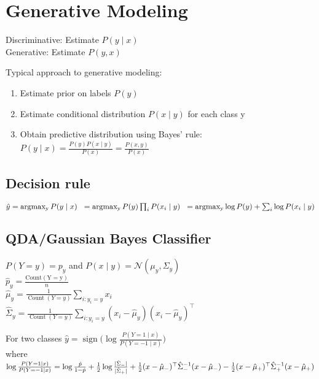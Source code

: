 \section*{Generative Modeling}
Discriminative: Estimate $P(y\mid x)$\\
Generative: Estimate $P(y,x)$

Typical approach to generative modeling:
\begin{enumerate}[noitemsep,leftmargin=6mm,topsep=2pt,parsep=2pt,partopsep=2pt]
    \item Estimate prior on labels $P(y)$
    \item Estimate conditional distribution $P(x\mid y)$ for each class y
    \item Obtain predictive distribution using Bayes' rule:
$P(y\mid x) = \frac{P(y) P(x\mid y)}{P(x)} = \frac{P(x,y)}{P(x)}$
\end{enumerate}

\subsection*{Decision rule}
$\hat{y} = \operatorname{argmax_{y}} P(y\mid x)\\
\hspace*{2.1mm}= \operatorname{argmax_{y}} P(y) \prod_{i} P(x_i\mid y)\\
\hspace*{2.1mm}= \operatorname{argmax_{y}} \log P(y) + \sum_{i} \log P(x_i\mid y)$

\subsection*{QDA/Gaussian Bayes Classifier}
$P(Y=y) = p_y$ and $P(x\mid y) = \mathcal{N}({\mu}_y, {\Sigma}_y)$\\
$\hat{p}_y= \frac{\operatorname{Count(Y = y)}}{n}$\\
$\hat{\mu}_{y} = \frac{1}{\operatorname{Count}(Y=y)} \sum_{i:y_i=y} {x_i} $\\
$\hat{\Sigma}_{y} = \frac{1}{\operatorname{Count}(Y=y)} \sum_{i:y_i=y} (x_i - \hat{\mu}_{y})(x_i-\hat{\mu}_y)^\top $

For two classes $\hat{y} = \operatorname{sign}\Big(\log\frac{P(Y=1\mid x)}{P(Y=-1\mid x)}\Big) $ 
\\ where  
$    \log\frac{P(Y=1\mid x)}{P(Y=-1\mid x)} = \log \frac{\hat{p}}{1-\hat{p}} + \frac{1}{2}\log \frac{|\hat{\Sigma}_-|}{|\hat{\Sigma}_+|}\\
    + \frac{1}{2}(x - \hat{\mu}_-)^\top \hat{\Sigma}_-^{-1} (x - \hat{\mu}_-) - \frac{1}{2}(x - \hat{\mu}_+)^\top \hat{\Sigma}_+^{-1} (x - \hat{\mu}_+)$

